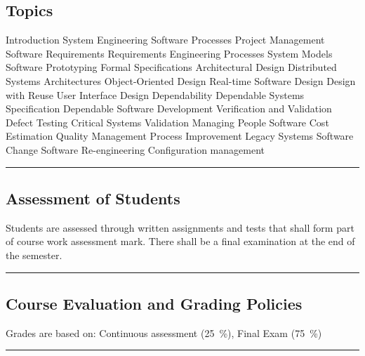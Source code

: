 \subsection*{Topics}
\begin{outline}
    \1 Introduction
    \1 System Engineering
    \1 Software Processes
    \1 Project Management
    \1 Software Requirements
    \1 Requirements Engineering Processes
    \1 System Models
    \1 Software Prototyping
    \1 Formal Specifications
    \1 Architectural Design
    \1 Distributed Systems Architectures
    \1 Object-Oriented Design
    \1 Real-time Software Design
    \1 Design with Reuse
    \1 User Interface Design
    \1 Dependability
    \1 Dependable Systems Specification
    \1 Dependable Software Development
    \1 Verification and Validation
    \1 Defect Testing
    \1 Critical Systems Validation
    \1 Managing People
    \1 Software Cost Estimation
    \1 Quality Management
    \1 Process Improvement
    \1 Legacy Systems
    \1 Software Change
    \1 Software Re-engineering
    \1 Configuration management
\end{outline}
\vspace{2ex} \hrule\vspace{2ex}

\subsection*{Assessment of Students}
\begin{outline}
    \1 Students are assessed through written assignments and tests that shall form part of course work assessment mark.
    \1 There shall be a final examination at the end of the semester.
\end{outline}
\vspace{2ex}\hrule\vspace{2ex}

\subsection*{Course Evaluation and Grading Policies}
Grades are based on:
Continuous assessment (\qty{25}{\percent}),
Final Exam (\qty{75}{\percent})
\vspace{2ex}\hrule\vspace{2ex}

